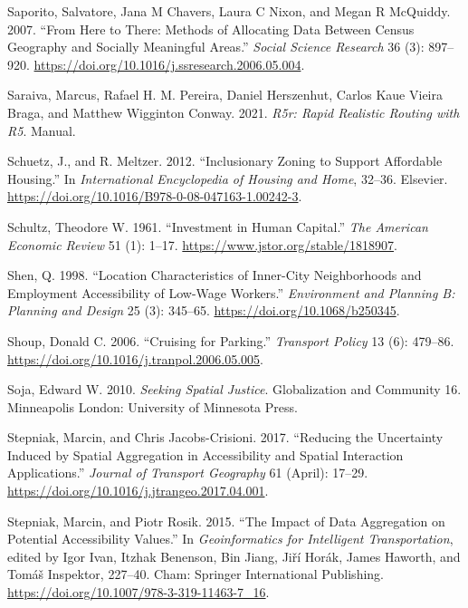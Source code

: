 \documentclass{article}
\newlength{\cslhangindent}
\newenvironment{CSLReferences}[2] %
 {\begin{list}{}{%
  \setlength{\itemindent}{0pt}
  \setlength{\leftmargin}{0pt}
  \setlength{\parsep}{0pt}
  \ifodd #1
   \setlength{\leftmargin}{\cslhangindent}
   \setlength{\itemindent}{-1\cslhangindent}
  \fi
  \setlength{\itemsep}{#2\baselineskip}}}
 {\end{list}}
\begin{document}
\begin{CSLReferences}{1}{0}
Saporito, Salvatore, Jana M Chavers, Laura C Nixon, and Megan R
McQuiddy. 2007. {``From Here to There: {Methods} of Allocating Data
Between Census Geography and Socially Meaningful Areas.''} \emph{Social
Science Research} 36 (3): 897--920.
\url{https://doi.org/10.1016/j.ssresearch.2006.05.004}.

Saraiva, Marcus, Rafael H. M. Pereira, Daniel Herszenhut, Carlos Kaue
Vieira Braga, and Matthew Wigginton Conway. 2021. \emph{R5r: {Rapid}
Realistic Routing with {R5}}. Manual.

Schuetz, J., and R. Meltzer. 2012. {``Inclusionary {Zoning} to {Support
Affordable Housing}.''} In \emph{International {Encyclopedia} of
{Housing} and {Home}}, 32--36. Elsevier.
\url{https://doi.org/10.1016/B978-0-08-047163-1.00242-3}.

Schultz, Theodore W. 1961. {``Investment in {Human Capital}.''}
\emph{The American Economic Review} 51 (1): 1--17.
\url{https://www.jstor.org/stable/1818907}.

Shen, Q. 1998. {``Location Characteristics of Inner-City Neighborhoods
and Employment Accessibility of Low-Wage Workers.''} \emph{Environment
and Planning B: Planning and Design} 25 (3): 345--65.
\url{https://doi.org/10.1068/b250345}.

Shoup, Donald C. 2006. {``Cruising for Parking.''} \emph{Transport
Policy} 13 (6): 479--86.
\url{https://doi.org/10.1016/j.tranpol.2006.05.005}.

Soja, Edward W. 2010. \emph{Seeking Spatial Justice}. Globalization and
Community 16. Minneapolis London: University of Minnesota Press.

Stepniak, Marcin, and Chris Jacobs-Crisioni. 2017. {``Reducing the
Uncertainty Induced by Spatial Aggregation in Accessibility and Spatial
Interaction Applications.''} \emph{Journal of Transport Geography} 61
(April): 17--29. \url{https://doi.org/10.1016/j.jtrangeo.2017.04.001}.

Stepniak, Marcin, and Piotr Rosik. 2015. {``The {Impact} of {Data
Aggregation} on {Potential Accessibility Values}.''} In
\emph{Geoinformatics for {Intelligent Transportation}}, edited by Igor
Ivan, Itzhak Benenson, Bin Jiang, Jiří Horák, James Haworth, and Tomáš
Inspektor, 227--40. Cham: Springer International Publishing.
\url{https://doi.org/10.1007/978-3-319-11463-7_16}.


\end{CSLReferences}
\end{document}
